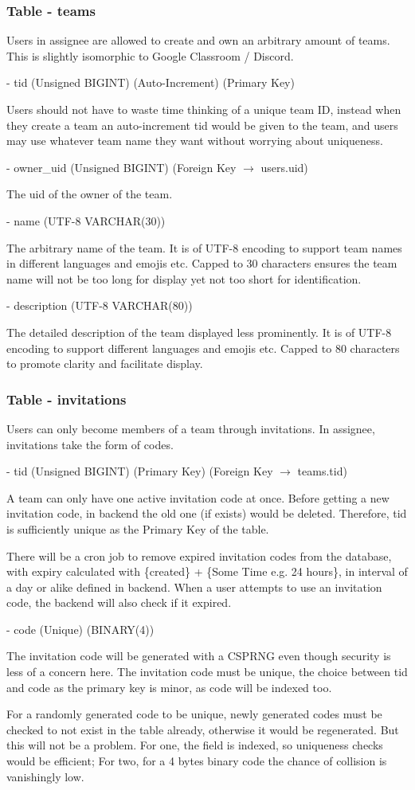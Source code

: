 \documentclass[12pt]{report}
\newcommand{\n}{\par}
\newcommand{\br}{\n\vspace{1 em}\n}
\begin{document}
\subsubsection{Table - teams} \label{data-layer.design.team-system.teams}
Users in assignee are allowed to create and own an arbitrary amount of teams.
This is slightly isomorphic to Google Classroom / Discord.
\br
- tid (Unsigned BIGINT) (Auto-Increment) (Primary Key)\n
Users should not have to waste time thinking of a unique team ID,
instead when they create a team an auto-increment tid would be given to the team,
and users may use whatever team name they want without worrying about uniqueness.
\br
- owner\_uid (Unsigned BIGINT) (Foreign Key $\rightarrow$ users.uid)\n
The uid of the owner of the team.
\br
- name (UTF-8 VARCHAR(30))\n
The arbitrary name of the team.
It is of UTF-8 encoding to support team names in different languages and emojis etc.
Capped to 30 characters ensures the team name will not be too long for display yet not too short for identification.
\br
- description (UTF-8 VARCHAR(80))\n
The detailed description of the team displayed less prominently.
It is of UTF-8 encoding to support different languages and emojis etc.
Capped to 80 characters to promote clarity and facilitate display.

\subsubsection{Table - invitations} \label{data-layer.design.team-system.invitations}
Users can only become members of a team through invitations.
In assignee, invitations take the form of codes.
\br
- tid (Unsigned BIGINT) (Primary Key) (Foreign Key $\rightarrow$ teams.tid)\n
A team can only have one active invitation code at once.
Before getting a new invitation code, in backend the old one (if exists) would be deleted.
Therefore, tid is sufficiently unique as the Primary Key of the table.\n
There will be a cron job to remove expired invitation codes from the database,
with expiry calculated with \{created\} + \{Some Time e.g. 24 hours\},
in interval of a day or alike defined in backend.
When a user attempts to use an invitation code, the backend will also check if it expired.\n
\br
- code (Unique) (BINARY(4))\n
The invitation code will be generated with a CSPRNG even though security is less of a concern here.
The invitation code must be unique, the choice between tid and code as the primary key is minor,
as code will be indexed too.\n
For a randomly generated code to be unique, newly generated codes must be checked to not exist in the table already,
otherwise it would be regenerated. But this will not be a problem.
For one, the field is indexed, so uniqueness checks would be efficient;
For two, for a 4 bytes binary code the chance of collision is vanishingly low.
\end{document}
